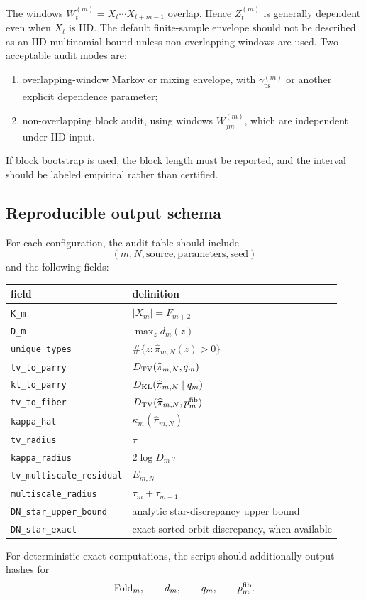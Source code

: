 The windows \(W_t^{(m)}=X_t\cdots X_{t+m-1}\) overlap.  Hence \(Z_t^{(m)}\) is generally dependent even when \(X_t\) is IID.  The default finite-sample envelope should not be described as an IID multinomial bound unless non-overlapping windows are used.  Two acceptable audit modes are:
\begin{enumerate}[label=(C\arabic*)]
\item overlapping-window Markov or mixing envelope, with \(\gamma_{\mathrm{ps}}^{(m)}\) or another explicit dependence parameter;
\item non-overlapping block audit, using windows \(W_{jm}^{(m)}\), which are independent under IID input.
\end{enumerate}
If block bootstrap is used, the block length must be reported, and the interval should be labeled empirical rather than certified.

\subsection{Reproducible output schema}

For each configuration, the audit table should include
\[
(m,N,\text{source},\text{parameters},\text{seed})
\]
and the following fields:
\begin{center}
\begin{tabular}{ll}
\toprule
field & definition\\
\midrule
\texttt{K\_m} & \(|X_m|=F_{m+2}\)\\
\texttt{D\_m} & \(\max_z d_m(z)\)\\
\texttt{unique\_types} & \(\#\{z:\widehat\pi_{m,N}(z)>0\}\)\\
\texttt{tv\_to\_parry} & \(D_{\mathrm{TV}}(\widehat\pi_{m,N},q_m)\)\\
\texttt{kl\_to\_parry} & \(D_{\mathrm{KL}}(\widehat\pi_{m,N}\mid q_m)\)\\
\texttt{tv\_to\_fiber} & \(D_{\mathrm{TV}}(\widehat\pi_{m,N},p_m^{\mathrm{fib}})\)\\
\texttt{kappa\_hat} & \(\kappa_m(\widehat\pi_{m,N})\)\\
\texttt{tv\_radius} & \(\tau\)\\
\texttt{kappa\_radius} & \(2\log D_m\,\tau\)\\
\texttt{tv\_multiscale\_residual} & \(E_{m,N}\)\\
\texttt{multiscale\_radius} & \(\tau_m+\tau_{m+1}\)\\
\texttt{DN\_star\_upper\_bound} & analytic star-discrepancy upper bound\\
\texttt{DN\_star\_exact} & exact sorted-orbit discrepancy, when available\\
\bottomrule
\end{tabular}
\end{center}
For deterministic exact computations, the script should additionally output hashes for
\[
\operatorname{Fold}_m,\qquad d_m,\qquad q_m,\qquad p_m^{\mathrm{fib}}.
\]

